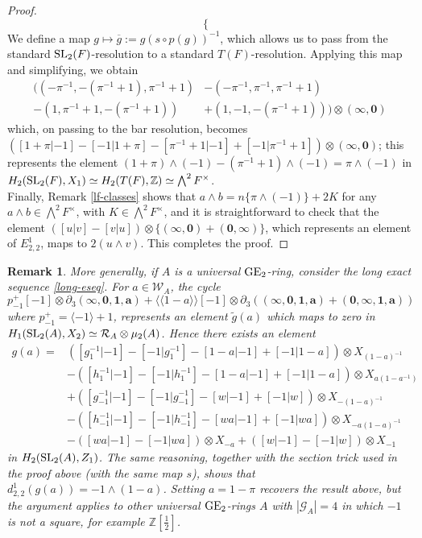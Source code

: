 \documentclass[11pt]{amsart}
\theoremstyle{definition}
\theoremstyle{plain}
\newtheorem{rem}[ntn]{Remark}
\numberwithin{equation}{section}
\newcommand{\z}{\mathbb{Z}}
\newcommand{\GG}{\mathcal{G}}
\newcommand{\RR}{\mathcal{R}}
\newcommand{\WW}{\mathcal{W}}
\newcommand{\half}{{\left[\frac{1}{2}\right]}}
\newcommand{\lan}{\langle}
\newcommand{\ran}{\rangle}
\newcommand{\Lan}{\langle \! \langle}
\newcommand{\Ran}{\rangle \! \rangle}
\newcommand{\GE}{{\rm GE}}
\newcommand{\SL}{\mathit{{\rm SL}}}
\begin{document}
\begin{proof}
\[\begin{cases}
        \end{cases}
    \]
    We define a map $g\mapsto\overline{g}:=g(s\circ p(g))^{-1}$, which allows us to pass from the standard $\SL_2(F)$-resolution to a standard $T(F)$-resolution. Applying this map and simplifying, we obtain
    \begin{align*}
        ((-\pi^{-1},-(\pi^{-1}+1),\pi^{-1}+1)&-(-\pi^{-1},\pi^{-1},\pi^{-1}+1)\\
        -(1,\pi^{-1}+1,-(\pi^{-1}+1))&+(1,-1,-(\pi^{-1}+1)))\otimes(\pmb{\infty},\pmb{0})
    \end{align*}
    which, on passing to the bar resolution, becomes $([1+\pi|-1]-[-1|1+\pi]-[\pi^{-1}+1|-1]+[-1|\pi^{-1}+1])\otimes(\pmb{\infty},\pmb{0})$; this represents the element $(1+\pi)\wedge(-1)-(\pi^{-1}+1)\wedge(-1)=\pi\wedge(-1)$ in $H_2(\SL_2(F),X_1)\simeq H_2(T(F),\z)\simeq\bigwedge^2F^{\times}$.\\

    Finally, Remark \ref{lf-classes} shows that $a\wedge b=n\{\pi\wedge(-1)\}+2K$ for any $a\wedge b\in\bigwedge^2 F^{\times}$, with $K\in\bigwedge^2F^{\times}$, and it is straightforward to check that the element $([u|v]-[v|u])\otimes\{(\pmb{\infty},\pmb{0})+(\pmb{0},\pmb{\infty})\}$, which represents an element of $E^1_{2,2}$, maps to $2(u\wedge v)$. This completes the proof.
\end{proof} 
\begin{rem}
    \label{rem-d211-gen}
    More generally, if $A$ is a universal $\GE_2$-ring, consider the long exact sequence \eqref{long-eseq}. For $a\in\WW_A$, the cycle
    \[
        p_{-1}^+[-1]\otimes\partial_3(\pmb{\infty},\pmb{0},\pmb{1},\pmb{a})+\Lan1-a\Ran[-1]\otimes\partial_3((\pmb{\infty},\pmb{0},\pmb{1},\pmb{a})+(\pmb{0},\pmb{\infty},\pmb{1},\pmb{a}))
    \]
    where $p_{-1}^+=\lan -1\ran+1$, represents an element $\tilde{g}(a)$ which maps to zero in $H_1(\SL_2(A),X_2)\simeq\RR_A\otimes\mu_2(A)$. Hence there exists an element
    \begin{align*}
        g(a)=&([g_1^{-1}|-1]-[-1|g_1^{-1}]-[1-a|-1]+[-1|1-a])\otimes X_{(1-a)^{-1}}\\
        &-([h_1^{-1}|-1]-[-1|h_1^{-1}]-[1-a|-1]+[-1|1-a])\otimes X_{a(1-a^{-1})}\\
        &+([g_{-1}^{-1}|-1]-[-1|g_{-1}^{-1}]-[w|-1]+[-1|w])\otimes X_{-(1-a)^{-1}}\\
        &-([h_{-1}^{-1}|-1]-[-1|h_{-1}^{-1}]-[wa|-1]+[-1|wa])\otimes X_{-a(1-a)^{-1}}\\
        &-([wa|-1]-[-1|wa])\otimes X_{-a}+([w|-1]-[-1|w])\otimes X_{-1}
    \end{align*}
    in $H_2(\SL_2(A),Z_1)$. The same reasoning, together with the section trick used in the proof above (with the same map $s$), shows that $d^1_{2,2}(g(a))=-1\wedge (1-a)$. Setting $a=1-\pi$ recovers the result above, but the argument applies to other universal $\GE_2$-rings $A$ with $|\GG_A|=4$ in which $-1$ is not a square, for example $\z\half$.  
\end{rem}
\end{document}
